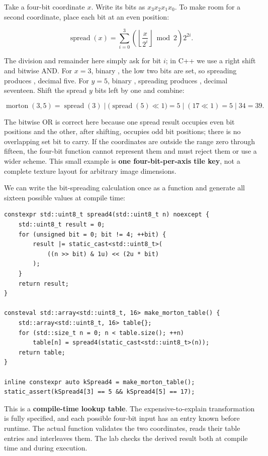 Take a four-bit coordinate \(x\). Write its bits as \(x_3x_2x_1x_0\). To make room for a second coordinate, place each bit at an even position:

\[
\operatorname{spread}(x)
=\sum_{i=0}^{3} \left(\left\lfloor\frac{x}{2^i}\right\rfloor\bmod 2\right)2^{2i}.
\]

The division and remainder here simply ask for bit \(i\); in C++ we use a right shift and bitwise AND. For \(x=3\), binary , the low two bits are set, so spreading produces , decimal five. For \(y=5\), binary , spreading produces , decimal seventeen. Shift the spread \(y\) bits left by one and combine:

\[
\operatorname{morton}(3,5)
=\operatorname{spread}(3)\;|\;
\big(\operatorname{spread}(5)\ll 1\big)
=5\;|\;(17\ll1)
=5\;|\;34
=39.
\]

The bitwise OR is correct here because one spread result occupies even bit positions and the other, after shifting, occupies odd bit positions; there is no overlapping set bit to carry. If the coordinates are outside the range zero through fifteen, the four-bit function cannot represent them and must reject them or use a wider scheme. This small example is \textbf{one four-bit-per-axis tile key}, not a complete texture layout for arbitrary image dimensions.

We can write the bit-spreading calculation once as a  function and generate all sixteen possible values at compile time:

\begin{verbatim}
constexpr std::uint8_t spread4(std::uint8_t n) noexcept {
    std::uint8_t result = 0;
    for (unsigned bit = 0; bit != 4; ++bit) {
        result |= static_cast<std::uint8_t>(
            ((n >> bit) & 1u) << (2u * bit)
        );
    }
    return result;
}

consteval std::array<std::uint8_t, 16> make_morton_table() {
    std::array<std::uint8_t, 16> table{};
    for (std::size_t n = 0; n < table.size(); ++n)
        table[n] = spread4(static_cast<std::uint8_t>(n));
    return table;
}

inline constexpr auto kSpread4 = make_morton_table();
static_assert(kSpread4[3] == 5 && kSpread4[5] == 17);
\end{verbatim}

This is a \textbf{compile-time lookup table}. The expensive-to-explain transformation is fully specified, and each possible four-bit input has an entry known before runtime. The actual function  validates the two coordinates, reads their table entries and interleaves them. The lab checks the derived result  both at compile time and during execution.


